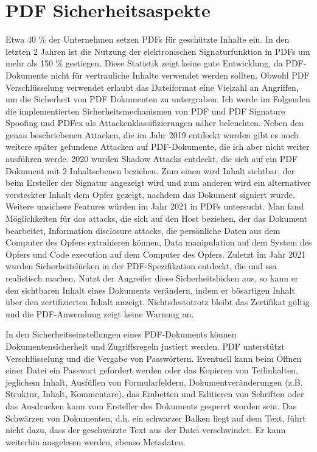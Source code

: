\section{PDF Sicherheitsaspekte}
Etwa 40 \% der Unternehmen setzen PDFs für geschützte Inhalte ein. In den letzten 2 Jahren ist die Nutzung der elektronischen Signaturfunktion in PDFs um mehr als 150 \% gestiegen. \cite{formilo} Diese Statistik zeigt keine gute Entwicklung, da PDF-Dokumente nicht für vertrauliche Inhalte verwendet werden sollten. Obwohl PDF Verschlüsselung verwendet erlaubt das Dateiformat eine Vielzahl an Angriffen, um die Sicherheit von PDF Dokumenten zu untergraben. Ich werde im Folgenden die implementierten Sicherheitsmechanismen von PDF und PDF Signature Spoofing und PDFex als Attackenklassifizierungen näher beleuchten. Neben den genau beschriebenen Attacken, die im Jahr 2019 entdeckt wurden gibt es noch weitere später gefundene Attacken auf PDF-Dokumente, die ich aber nicht weiter ausführen werde. 2020 wurden Shadow Attacks entdeckt, die sich auf ein PDF Dokument mit 2 Inhaltsebenen beziehen. Zum einen wird Inhalt sichtbar, der beim Ersteller der Signatur angezeigt wird und zum anderen wird ein alternativer versteckter Inhalt dem Opfer gezeigt, nachdem das Dokument signiert wurde. Weitere unsichere Features würden im Jahr 2021 in PDFs untersucht. Man fand Möglichkeiten für \gls{dos} attacks, die sich auf den Host beziehen, der das Dokument bearbeitet, Information disclosure attacks, die persönliche Daten aus dem Computer des Opfers extrahieren können, Data manipulation auf dem System des Opfers und Code execution auf dem Computer des Opfers. Zuletzt im Jahr 2021 wurden Sicherheitslücken in der PDF-Spezifikation entdeckt, die  und \gls{ssa} realistisch machen. Nutzt der Angreifer diese Sicherheitslücken aus, so kann er den sichtbaren Inhalt eines Dokuments verändern, indem er bösartigen Inhalt über den zertifizierten Inhalt anzeigt. Nichtsdestotrotz bleibt das Zertifikat gültig und die PDF-Anwendung zeigt keine Warnung an.
\par
In den Sicherheitseinstellungen eines PDF-Dokuments können Dokumentensicherheit und Zugriffsregeln justiert werden. PDF unterstützt Verschlüsselung und die Vergabe von Passwörtern. Eventuell kann beim Öffnen einer Datei ein Passwort gefordert werden oder das Kopieren von Teilinhalten, jeglichem Inhalt, Ausfüllen von Formularfeldern, Dokumentveränderungen (z.B. Struktur, Inhalt, Kommentare), das Einbetten und Editieren von Schriften oder das Ausdrucken kann vom Ersteller des Dokuments gesperrt worden sein. Das Schwärzen von Dokumenten, d.h. ein schwarzer Balken liegt auf dem Text, führt nicht dazu, dass der geschwärzte Text aus der Datei verschwindet. Er kann weiterhin ausgelesen werden, ebenso Metadaten. 
\cite{adobe-pdf-pades}

